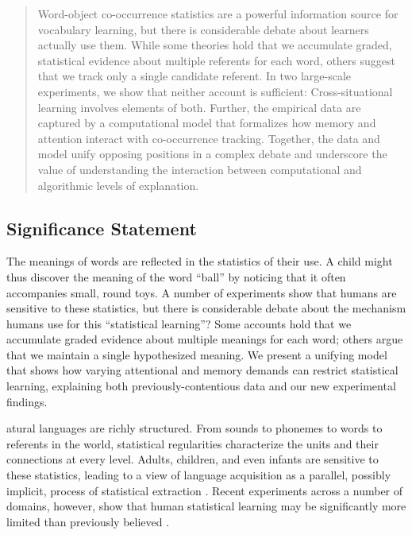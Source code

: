 \documentclass{pnastwo}
\begin{document}
\begin{article}
\begin{abstract}
Word-object co-occurrence statistics are a powerful information source for vocabulary learning, but there is considerable debate about learners actually use them. While some theories hold that we accumulate graded, statistical evidence about multiple referents for each word, others suggest that we track only a single candidate referent. In two large-scale experiments, we show that neither account is sufficient: Cross-situational learning involves elements of both. Further, the empirical data are captured by a computational model that formalizes how memory and attention interact with co-occurrence tracking. Together, the data and model unify opposing positions in a complex debate and underscore the value of understanding the interaction between computational and algorithmic levels of explanation.
\end{abstract}

\subsection{Significance Statement}
The meanings of words are reflected in the statistics of their use. A child might thus discover the meaning of the word ``ball'' by noticing that it often accompanies small, round toys. A number of experiments show that humans are sensitive to these statistics, but there is considerable debate about the mechanism humans use for this ``statistical learning''? Some accounts hold that we accumulate graded evidence about multiple meanings for each word; others argue that we maintain a single hypothesized meaning. We present a unifying model that shows how varying attentional and memory demands can restrict statistical learning, explaining both previously-contentious data and our new experimental findings.

\vspace{12 pt}

atural languages are richly structured. From sounds to phonemes to words to referents in the world, statistical regularities characterize the units and their connections at every level. Adults, children, and even infants are sensitive to these statistics, leading to a view of language acquisition as a parallel, possibly implicit, process of statistical extraction \citep{Saffran1996a, Gomez2000}. Recent experiments across a number of domains, however, show that human statistical learning may be significantly more limited than previously believed \citep{Johnson2010c, Yurovsky2012c, Trueswell2013}.


\end{article}
\end{document}
